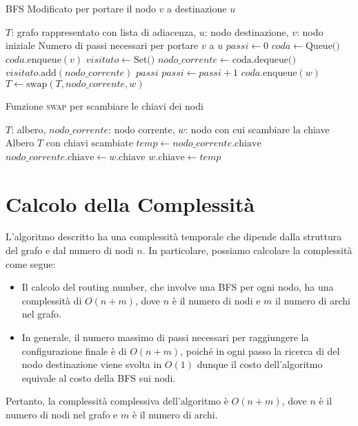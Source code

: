 \begin{algorithm}[h]
\caption{BFS Modificato per portare il nodo $v$ a destinazione $u$}
\small  %
\begin{algorithmic}[1]
\Require $T$: grafo rappresentato con lista di adiacenza, $u$: nodo destinazione, $v$: nodo iniziale
\Ensure Numero di passi necessari per portare $v$ a $u$
    \State $passi \gets 0$
    \State $coda \gets \text{Queue()}$
    \State $coda.\text{enqueue}(v)$
    \State $visitato \gets \text{Set()}$
        \State $nodo\_corrente \gets \text{coda.dequeue()}$
        \State $visitato.\text{add}(nodo\_corrente)$
            \State \Return $passi$
        \EndIf
            \State $passi \gets passi + 1$
            \State $coda.\text{enqueue}(w)$
            \State $T \gets \text{swap}(T, nodo\_corrente, w)$
        \EndFor
    \EndWhile
\EndFunction
\end{algorithmic}
\end{algorithm}

\begin{algorithm}[h]
\caption{Funzione \textsc{swap} per scambiare le chiavi dei nodi}
\small  %
\begin{algorithmic}[1]
\Require $T$: albero, $nodo\_corrente$: nodo corrente, $w$: nodo con cui scambiare la chiave
\Ensure Albero $T$ con chiavi scambiate
    \State $temp \gets nodo\_corrente.\text{chiave}$
    \State $nodo\_corrente.\text{chiave} \gets w.\text{chiave}$
    \State $w.\text{chiave} \gets temp$
\EndFunction
\end{algorithmic}
\end{algorithm}

\section{Calcolo della Complessità}
L'algoritmo descritto \cite{routing number spanning tree} ha una complessità temporale che dipende dalla struttura del grafo e dal numero di nodi $n$. In particolare, possiamo calcolare la complessità come segue:

\begin{itemize}
    \item Il calcolo del routing number, che involve una BFS per ogni nodo, ha una complessità di $O(n + m)$, dove $n$ è il numero di nodi e $m$ il numero di archi nel grafo.
    \item In generale, il numero massimo di passi necessari per raggiungere la configurazione finale è di $O(n+m)$, poiché in ogni passo la ricerca di del nodo destinazione viene svolta in $O(1)$ dunque il costo dell'algoritmo equivale al costo della BFS sui nodi. 
\end{itemize}

Pertanto, la complessità complessiva dell'algoritmo è $O(n+m)$, dove $n$ è il numero di nodi nel grafo e $m$ è il numero di archi.